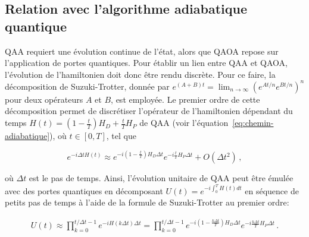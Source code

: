 
\subsection{Relation avec l'algorithme adiabatique quantique}
\label{subsec:discretisation-qaoa}

QAA requiert une évolution continue de l'état, alors que QAOA repose sur l'application de portes quantiques. Pour établir un lien entre QAA et QAOA, l'évolution de l'hamiltonien doit donc être rendu discrète. Pour ce faire, la décomposition de Suzuki-Trotter, donnée par $e^{(A+B)t} = \lim_{n \to \infty} (e^{At / n} e^{Bt / n})^{n}$ pour deux opérateurs $A$ et $B$, est employée. Le premier ordre de cette décomposition permet de discrétiser l'opérateur de l'hamiltonien dépendant du temps $H(t)=(1-\frac{t}{T})H_{D} + \frac{t}{T}H_{P}$ de QAA (voir l'équation~\ref{eq:chemin-adiabatique}), où $t \in [0, T]$, tel que

\begin{equation}
    e^{-i\Delta t H(t)} \approx e^{-i (1 - \frac{t}{T}) H_D \Delta t} e^{-i \frac{t}{T} H_P \Delta t} + O(\Delta t^2) \,,
\end{equation}

où $\Delta t$ est le pas de temps. Ainsi, l'évolution unitaire de QAA peut être émulée avec des portes quantiques en décomposant $U(t) = e^{-i \int_{0}^{T} H(t) dt}$ en séquence de petits pas de temps à l'aide de la formule de Suzuki-Trotter au premier ordre:

\begin{align*}
   U(t) \approx \prod_{k=0}^{t / \Delta t -1} e^{-i H(k \Delta t) \Delta t} = \prod_{k=0}^{t / \Delta t -1} e^{-i (1 - \frac{k \Delta t}{T}) H_{D} \Delta t} e^{- i \frac{k \Delta t}{T} H_{P} \Delta t} \,.
\end{align*}

